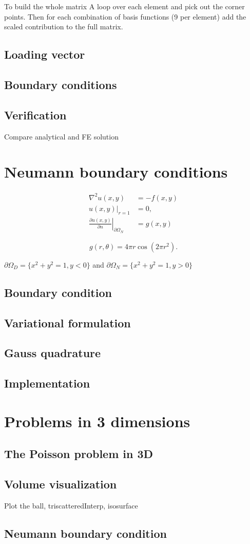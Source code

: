 \documentclass[paper=a4, fontsize=11pt]{scrartcl} %
\begin{document}
To build the whole matrix A loop over each element and pick out the corner points. Then for each combination of basis functions (9 per element) add the scaled contribution to the full matrix.

\subsection{Loading vector}

\subsection{Boundary conditions}
\subsection{Verification}
Compare analytical and FE solution

\section{Neumann boundary conditions}
\begin{equation}
\begin{aligned}
\nabla^2u(x,y) 	&= -f(x,y) \\
u(x,y)|_{r=1} 	&= 0, \\
\left. \frac{\partial u(x,y)}{\partial n}\right|_{\partial\Omega_N} &= g(x,y)
\end{aligned}
\label{eq:poisson2d:Neu:problem}
\end{equation}

\begin{equation}
g(r,\theta) =4\pi r\cos(2\pi r^2).
\label{eq:poisson2d:Neu:condition}
\end{equation}

$\partial\Omega_D = \{x^2+y^2=1,y<0\}$ and $\partial\Omega_N = \{x^2+y^2=1,y>0\}$

\subsection{Boundary condition}
\subsection{Variational formulation}
\subsection{Gauss quadrature}
\subsection{Implementation}

\section{Problems in 3 dimensions}
\subsection{The Poisson problem in 3D}
\subsection{Volume visualization}
Plot the ball, triscatteredInterp, isosurface
\subsection{Neumann boundary condition}
\end{document}

